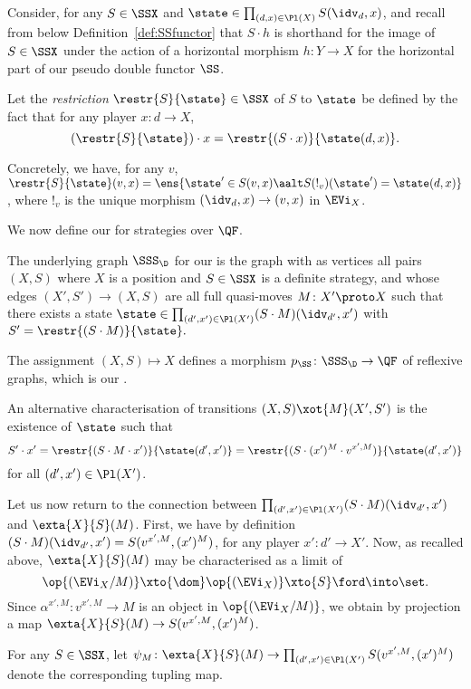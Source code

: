 \documentclass{LMCS}
\theoremstyle{plain}\newtheorem{satz}[thm]{Satz}
\begin{document}
Consider, for any $S \in \SSX$ and $\state \in \prod_{(d,x) \in \Pl
  (X)} S (\idv_d, x)$, and recall from below
Definition~\ref{def:SSfunctor} that $S \cdot h$ is shorthand for the
image of $S \in \SSX$ under the action of a horizontal morphism $h
\colon Y \to X$ for the horizontal part of our pseudo double functor
$\SS$.

\begin{defi}
  Let the \emph{restriction} $\restr{S}{\state} \in \SSX$ of $S$ to
  $\state$ be defined by the fact that for any player $x \colon d \to
  X$, $$(\restr{S}{\state}) \cdot x = \restr{(S \cdot x)}{\state (d,x)}.$$
\end{defi}
Concretely, we have, for any $v$, $\restr{S}{\state} (v,x) =
\ens{\state' \in S (v,x) \aalt S(!_v)(\state') = \state(d, x)}$, where
$!_v$ is the unique morphism $(\idv_d,x) \to (v,x)$ in $\EVi_X$.

We now define our \lts{} for strategies over $\QF$.
\begin{defi}
  The underlying graph $\SSS_\D$ for our \lts{} is the graph with as
  vertices all pairs $(X, S)$ where $X$ is a position and $S \in \SSX$
  is a definite strategy, and whose edges $(X',S') \to (X,S)$ are all
  full quasi-moves $M \colon X' \proto X$ such that there exists a
  state $\state \in \prod_{(d',x') \in \Pl (X')} (S \cdot M)
  (\idv_{d'}, x')$ with $S' = \restr{(S \cdot M)}{\state}.$

The assignment $(X,S) \mapsto X$ defines a morphism $p_{\SS} \colon
\SSS_\D \to \QF$ of reflexive graphs, which is our \lts{}.
\end{defi}
An alternative characterisation of transitions $(X,S) \xot{M} (X',S')$ is the existence of $\state$ such that
$$S' \cdot x' = \restr{(S \cdot M \cdot x')}{\state(d',x')} = \restr{(S \cdot (x')^M \cdot v^{x',M})}{\state(d',x')}$$
for all $(d',x') \in \Pl (X')$.

Let us now return to the connection between $\prod_{(d',x') \in \Pl (X')} (S \cdot M) (\idv_{d'}, x')$
and $\exta{X}{S}(M)$.
First, we have
by definition $(S \cdot M) (\idv_{d'}, x') = S (v^{x',M}, (x')^M)$,
for any player $x' \colon d' \to X'$.  
Now, as recalled above, $\exta{X}{S}(M)$ may be characterised as a
limit of
  $$\op{(\EVi_X / M)} \xto{\dom} \op{(\EVi_X)} \xto{S} \ford \into \set.$$ 
  Since $\alpha^{x',M} \colon v^{x',M} \to M$ is an object in
  $\op{(\EVi_X / M)}$, we obtain by projection a map $\exta{X}{S} (M)
  \to S(v^{x',M},(x')^M)$.

\begin{defi}
  For any $S \in \SSX$, let $\psi_M \colon \exta{X}{S}(M) \to
  \prod_{(d',x') \in \Pl (X')} S(v^{x',M},(x')^M)$ denote the
  corresponding tupling map.
\end{defi}
\end{document}

